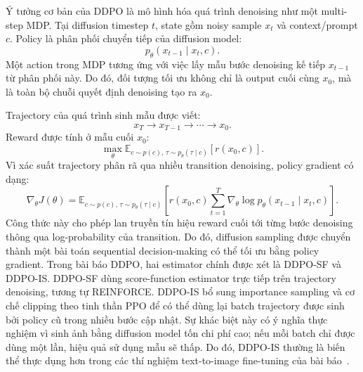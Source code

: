 Ý tưởng cơ bản của DDPO là mô hình hóa quá trình denoising như một multi-step MDP.
Tại diffusion timestep $t$, state gồm noisy sample $x_t$ và context/prompt $c$.
Policy là phân phối chuyển tiếp của diffusion model:
\begin{equation}
    p_\theta(x_{t-1}\mid x_t,c).
\end{equation}
Một action trong MDP tương ứng với việc lấy mẫu bước denoising kế tiếp $x_{t-1}$ từ phân phối này.
Do đó, đối tượng tối ưu không chỉ là output cuối cùng $x_0$, mà là toàn bộ chuỗi quyết định denoising tạo ra $x_0$.

Trajectory của quá trình sinh mẫu được viết:
\begin{equation}
    x_T \rightarrow x_{T-1} \rightarrow \cdots \rightarrow x_0.
\end{equation}
Reward được tính ở mẫu cuối $x_0$:
\begin{equation}
    \max_\theta
    \mathbb{E}_{c\sim p(c),\,\tau\sim p_\theta(\tau\mid c)}
    \left[
        r(x_0,c)
    \right].
\end{equation}
Vì xác suất trajectory phân rã qua nhiều transition denoising, policy gradient có dạng:
\begin{equation}
    \nabla_\theta J(\theta)
    =
    \mathbb{E}_{c\sim p(c),\,\tau\sim p_\theta(\tau\mid c)}
    \left[
        r(x_0,c)
        \sum_{t=1}^{T}
        \nabla_\theta
        \log p_\theta(x_{t-1}\mid x_t,c)
    \right].
\end{equation}
Công thức này cho phép lan truyền tín hiệu reward cuối tới từng bước denoising thông qua log-probability của transition.
Do đó, diffusion sampling được chuyển thành một bài toán sequential decision-making có thể tối ưu bằng policy gradient.
Trong bài báo DDPO, hai estimator chính được xét là DDPO-SF và DDPO-IS.
DDPO-SF dùng score-function estimator trực tiếp trên trajectory denoising, tương tự REINFORCE.
DDPO-IS bổ sung importance sampling và cơ chế clipping theo tinh thần PPO để có thể dùng lại batch trajectory được sinh bởi policy cũ trong nhiều bước cập nhật.
Sự khác biệt này có ý nghĩa thực nghiệm vì sinh ảnh bằng diffusion model tốn chi phí cao; nếu mỗi batch chỉ được dùng một lần, hiệu quả sử dụng mẫu sẽ thấp.
Do đó, DDPO-IS thường là biến thể thực dụng hơn trong các thí nghiệm text-to-image fine-tuning của bài báo~\citep{black2024ddpo}.

